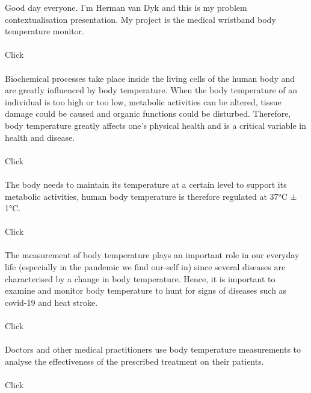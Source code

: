 \documentclass[a4paper, 12pt]{report}
\begin{document}
	Good day everyone. I'm Herman van Dyk and this is my problem contextualisation presentation. My project is the medical wristband body temperature monitor.
	\\\\
	Click
	\\\\
	
	
	 Biochemical processes take place inside the living cells of the human body and are greatly influenced by body temperature. When the body temperature of an individual is too high or too low, metabolic activities can be altered, tissue damage could be caused and organic functions could be disturbed. Therefore, body temperature greatly affects one’s physical health and is a critical variable in health and disease.
	\\\\
	Click
	\\\\
	The body needs to maintain its temperature at a certain level to support its metabolic activities, human body temperature is therefore regulated at 37°C ± 1°C. 
	\\\\
	Click
	\\\\
	The measurement of body temperature plays an important role in our everyday life (especially in the pandemic we find our-self in) since several diseases are characterised by a change in body temperature. Hence, it is important to examine and monitor body temperature to hunt for signs of diseases such as covid-19 and heat stroke. 
	\\\\
	Click
	\\\\
	Doctors and other medical practitioners use body temperature measurements to analyse the effectiveness of the prescribed treatment on their patients. 
	\\\\
	Click
	\\\\
	
\end{document}
